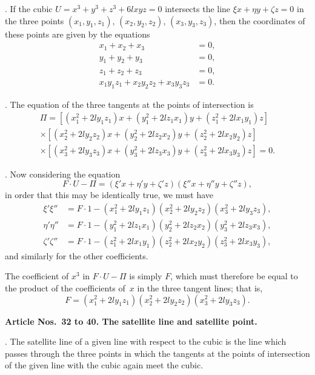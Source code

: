 \documentclass[12pt,a4paper]{article}
\theoremstyle{definition}
\begin{document}
. If the cubic $U = x^{3} + y^{3} + z^{3} + 6lxyz = 0$
intersects the line $\xi x + \eta y + \zeta z = 0$ in the three points
$(x_{1}, y_{1}, z_{1})$, $(x_{2}, y_{2}, z_{2})$, $(x_{3}, y_{3}, z_{3})$, then the coordinates
of these points are given by the equations
\begin{align*}
x_{1} + x_{2} + x_{3} &= 0, \\
y_{1} + y_{2} + y_{3} &= 0, \\
z_{1} + z_{2} + z_{3} &= 0, \\
x_{1}y_{1}z_{1} + x_{2}y_{2}z_{2} + x_{3}y_{3}z_{3} &= 0.
\end{align*}

. The equation of the three tangents at the points of
intersection is
\begin{multline*}
\Pi = [(x_{1}^{2} + 2ly_{1}z_{1})x + (y_{1}^{2} + 2lz_{1}x_{1})y + (z_{1}^{2} + 2lx_{1}y_{1})z] \\
\times [(x_{2}^{2} + 2ly_{2}z_{2})x + (y_{2}^{2} + 2lz_{2}x_{2})y + (z_{2}^{2} + 2lx_{2}y_{2})z] \\
\times [(x_{3}^{2} + 2ly_{3}z_{3})x + (y_{3}^{2} + 2lz_{3}x_{3})y + (z_{3}^{2} + 2lx_{3}y_{3})z] = 0.
\end{multline*}

. Now considering the equation
\[
F \cdot U - \Pi = (\xi' x + \eta' y + \zeta' z)(\xi'' x + \eta'' y + \zeta'' z),
\]
in order that this may be identically true, we must have
\begin{align*}
\xi'\xi'' &= F \cdot 1 - (x_{1}^{2} + 2ly_{1}z_{1})(x_{2}^{2} + 2ly_{2}z_{2})(x_{3}^{2} + 2ly_{3}z_{3}), \\
\eta'\eta'' &= F \cdot 1 - (y_{1}^{2} + 2lz_{1}x_{1})(y_{2}^{2} + 2lz_{2}x_{2})(y_{3}^{2} + 2lz_{3}x_{3}), \\
\zeta'\zeta'' &= F \cdot 1 - (z_{1}^{2} + 2lx_{1}y_{1})(z_{2}^{2} + 2lx_{2}y_{2})(z_{3}^{2} + 2lx_{3}y_{3}),
\end{align*}
and similarly for the other coefficients.

The coefficient of $x^{3}$ in $F \cdot U - \Pi$ is simply $F$, which
must therefore be equal to the product of the coefficients of~$x$
in the three tangent lines; that is,
\[
F = (x_{1}^{2} + 2ly_{1}z_{1})(x_{2}^{2} + 2ly_{2}z_{2})(x_{3}^{2} + 2ly_{3}z_{3}).
\]

\medskip\noindent\textbf{Article Nos.~32 to 40. The satellite line and satellite point.}

. The satellite line of a given line with respect to the
cubic is the line which passes through the three points in which
the tangents at the points of intersection of the given line with
the cubic again meet the cubic.
\end{document}
